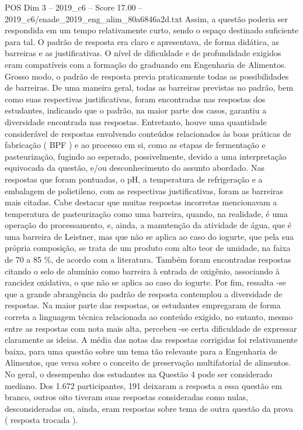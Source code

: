 \begin{textsample}{POS Dim 3 – 2019\_c6 – Score 17.00 – 2019\_c6/enade\_2019\_eng\_alim\_80a6846a2d.txt}
Assim, a questão poderia ser respondida em um tempo relativamente curto, sendo o espaço destinado suficiente para tal.
O padrão de resposta era claro e apresentava, de forma didática, as barreiras e as justificativas.
O nível de dificuldade e de profundidade exigidos eram compatíveis com a formação do graduando em Engenharia de Alimentos.
Grosso modo, o padrão de resposta previa praticamente todas as possibilidades de barreiras.
De uma maneira geral, todas as barreiras previstas no padrão, bem como suas respectivas justificativas, foram encontradas nas respostas dos estudantes, indicando que o padrão, na maior parte dos casos, garantiu a diversidade encontrada nas respostas.
Entretanto, houve uma quantidade considerável de respostas envolvendo conteúdos relacionados às boas práticas de fabricação ( BPF ) e ao processo em si, como as etapas de fermentação e pasteurização, fugindo ao esperado, possivelmente, devido a uma interpretação equivocada da questão, e/ou desconhecimento do assunto abordado.
Nas respostas que foram pontuadas, o pH, a temperatura de refrigeração e a embalagem de polietileno, com as respectivas justificativas, foram as barreiras mais citadas.
Cabe destacar que muitas respostas incorretas mencionavam a temperatura de pasteurização como uma barreira, quando, na realidade, é uma operação do processamento, e, ainda, a manutenção da atividade de água, que é uma barreira de Leistner, mas que não se aplica ao caso do iogurte, que pela sua própria composição, se trata de um produto com alto teor de umidade, na faixa de 70 a 85 \%, de acordo com a literatura.
Também foram encontradas respostas citando o selo de alumínio como barreira à entrada de oxigênio, associando à rancidez oxidativa, o que não se aplica ao caso do iogurte.
Por fim, ressalta -se que a grande abrangência do padrão de resposta contemplou a diversidade de respostas.
Na maior parte das respostas, os estudantes empregaram de forma correta a linguagem técnica relacionada ao conteúdo exigido, no entanto, mesmo entre as respostas com nota mais alta, percebeu -se certa dificuldade de expressar claramente as ideias.
A média das notas das respostas corrigidas foi relativamente baixa, para uma questão sobre um tema tão relevante para a Engenharia de Alimentos, que versa sobre o conceito de preservação multifatorial de alimentos.
No geral, o desempenho dos estudantes na Questão 4 pode ser considerado mediano.
Dos 1.672 participantes, 191 deixaram a resposta a essa questão em branco, outros oito tiveram suas respostas consideradas como nulas, desconsideradas ou, ainda, eram respostas sobre tema de outra questão da prova ( resposta trocada ).

\end{textsample}

